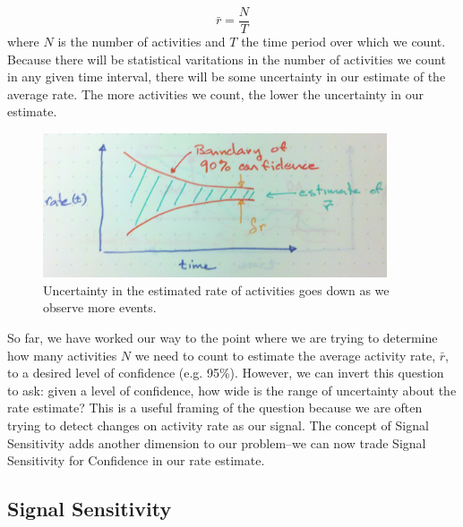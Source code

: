 \documentclass{article}
\begin{document}
\begin{equation}
    \label{eq:rateEst}
    \bar{r} = \frac{N}{T}
\end{equation}
where $N$ is the number of activities and $T$ the time period over which we count.  Because there will be statistical varitations in the number of activities we count in any given time interval, there will be some uncertainty in our estimate of the average rate. The more activities we count, the lower the uncertainty in our estimate.

%
\begin{figure}[h]
	\begin{center}
		\includegraphics[width=4.0in]{./imgs/confidence.jpg}
	\end{center}
	\caption{Uncertainty in the estimated rate of activities goes down as we observe more events. }
    	\label{fig:confidence}
\end{figure}
%
%


%
%
%


So far, we have worked our way to the point where we are trying to determine how many activities $N$ we need to count to estimate the average activity rate, $\bar{r}$, to a desired level of confidence (e.g. 95\%). However, we can invert this question to ask: given a level of confidence, how wide is the range of uncertainty about the rate estimate?  This is a useful framing of the question because we are often trying to detect changes on activity rate as our signal. The concept of Signal Sensitivity adds another dimension to our problem--we can now trade Signal Sensitivity for Confidence in our rate estimate.

\subsection{Signal Sensitivity}
\end{document}
